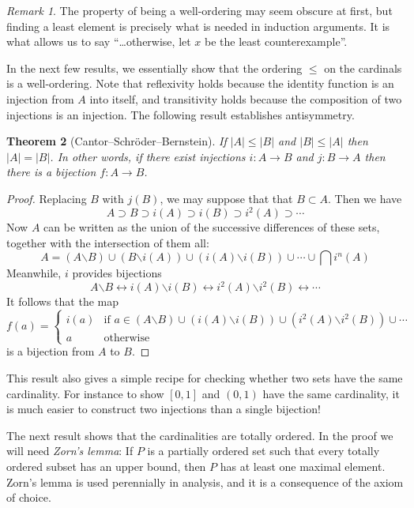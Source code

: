 \documentclass[11pt,oneside,a4paper]{amsbook}
\theoremstyle{definition}
\theoremstyle{plain}
\newtheorem{theorem}{Theorem}[section]
\theoremstyle{definition}
\theoremstyle{remark}
\newtheorem{remark}[theorem]{Remark}
\numberwithin{equation}{section}
\numberwithin{figure}{section}
\begin{document}
\begin{remark}
  The property of being a well-ordering may seem obscure at first, but finding a least element is precisely what is needed in induction arguments. It is what allows us to say ``\ldots otherwise, let $x$ be the least counterexample''.
\end{remark}

In the next few results, we essentially show that the ordering $\leq$ on the cardinals is a well-ordering. Note that reflexivity holds because the identity function is an injection from $A$ into itself, and transitivity holds because the composition of two injections is an injection. The following result establishes antisymmetry.

\begin{theorem}[Cantor--Schr\"oder--Bernstein]
  \label{thm:csb}
  If $|A|\leq|B|$ and $|B|\leq|A|$ then $|A|=|B|$. In other words, if there exist injections $i\colon A\to B$ and $j\colon B\to A$ then there is a bijection $f\colon A\to B$.
\end{theorem}

\begin{proof}
  Replacing $B$ with $j(B)$, we may suppose that that $B\subset A$. Then we have
  \[A\supset B\supset i(A)\supset i(B)\supset i^2(A)\supset\cdots
  \]
  Now $A$ can be written as the union of the successive differences of these sets, together with the intersection of them all:
  \[A=(A\mathord{\smallsetminus}B)\cup(B\mathord{\smallsetminus}i(A))
  \cup(i(A)\mathord{\smallsetminus}i(B))\cup\cdots\cup \bigcap i^n(A)
  \]
  Meanwhile, $i$ provides bijections
  \[A\mathord{\smallsetminus}B\leftrightarrow i(A)\mathord{\smallsetminus}i(B)\leftrightarrow i^2(A)\mathord{\smallsetminus}i^2(B)\leftrightarrow\cdots
  \]
  It follows that the map
  \[f(a)=\begin{cases}i(a)&\text{if }a\in(A\mathord{\smallsetminus}B)\cup(i(A)\mathord{\smallsetminus}i(B))\cup(i^2(A)\mathord{\smallsetminus}i^2(B))\cup\cdots\\
    a&\text{otherwise}
  \end{cases}
  \]
  is a bijection from $A$ to $B$.
\end{proof}

This result also gives a simple recipe for checking whether two sets have the same cardinality. For instance to show $[0,1]$ and $(0,1)$ have the same cardinality, it is much easier to construct two injections than a single bijection!

The next result shows that the cardinalities are totally ordered. In the proof we will need \emph{Zorn's lemma}: If $P$ is a partially ordered set such that every totally ordered subset has an upper bound, then $P$ has at least one maximal element.  Zorn's lemma is used perennially in analysis, and it is a consequence of the axiom of choice.
\end{document}
